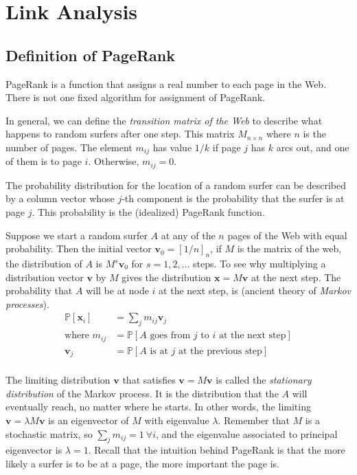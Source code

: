 \chapter{Link Analysis}\label{chap:link-analysis}

\section{Definition of PageRank}\label{sec:def-pagerank}

PageRank is a function that assigns a real number to each page in the Web. There is not one fixed algorithm for assignment of PageRank.

In general, we can define the \textit{transition matrix of the Web} to describe what happens to random surfers after one step. This matrix $M_{n \times n}$ where $n$ is the number of pages. The element $m_{ij}$ has value $1/k$ if page $j$ has $k$ arcs out, and one of them is to page $i$. Otherwise, $m_{ij} = 0$.

The probability distribution for the location of a random surfer can be described by a column vector whose $j$-th component is the probability that the surfer is at page $j$. This probability is the (idealized) PageRank function.

Suppose we start a random surfer $A$ at any of the $n$ pages of the Web with equal probability. Then the initial vector $\textbf{v}_0 = [1/n]_n$, if $M$ is the matrix of the web, the distribution of $A$ is $M^s\textbf{v}_0$ for $s = 1, 2, \ldots$ steps. To see why multiplying a distribution vector $\textbf{v}$ by $M$ gives the distribution $\textbf{x} = M\textbf{v}$ at the next step.
The probability that $A$ will be at node $i$ at the next step, is (ancient theory of \textit{Markov processes}).
\begin{equation*}
    \begin{split}
        \mathbb{P} [\textbf{x}_i]  & = \sum_{j} m_{ij}\textbf{v}_j\\
        \text{where } m_{ij} & = \mathbb{P}[A \text{ goes from } j \text{ to } i \text{ at the next step}] \\
        \textbf{v}_j & = \mathbb{P}[A \text{ is at } j \text{ at the previous step}] \\
    \end{split}
\end{equation*}

The limiting distribution $\textbf{v}$ that satisfies $\textbf{v} = M\textbf{v}$ is called the \textit{stationary distribution} of the Markov process. It is the distribution that the $A$ will eventually reach, no matter where he starts. In other words, the limiting $\textbf{v} = \lambda M \textbf{v}$ is an eigenvector of $M$ with eigenvalue $\lambda$. Remember that $M$ is a stochastic matrix, so $\sum_{j} m_{ij} = 1 \ \forall i$, and the eigenvalue associated to principal eigenvector is  $\lambda = 1$.
Recall that the intuition behind PageRank is that the more likely a surfer is to be at a page, the more important the page is.

